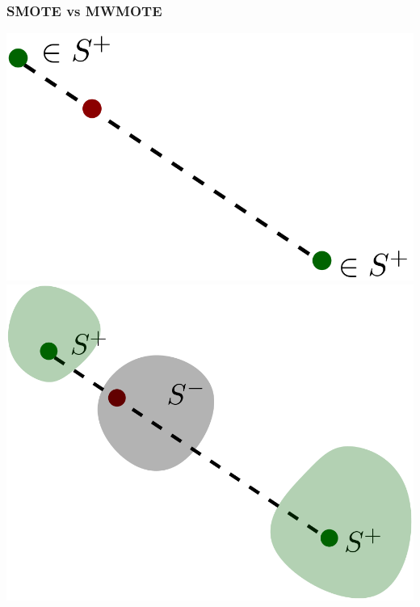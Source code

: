  \begin{frame}\frametitle{SMOTE vs MWMOTE}
 \begin{center}
   \begin{overprint}
    \vspace{2cm} \centering\includegraphics[scale=0.25]{imgs/smote.png}
    \vspace{1.12cm} \hspace{-0.65cm}\centering\includegraphics[scale=0.25]{imgs/smote-flaws.png}

\end{overprint}
\end{center}
\end{frame}
